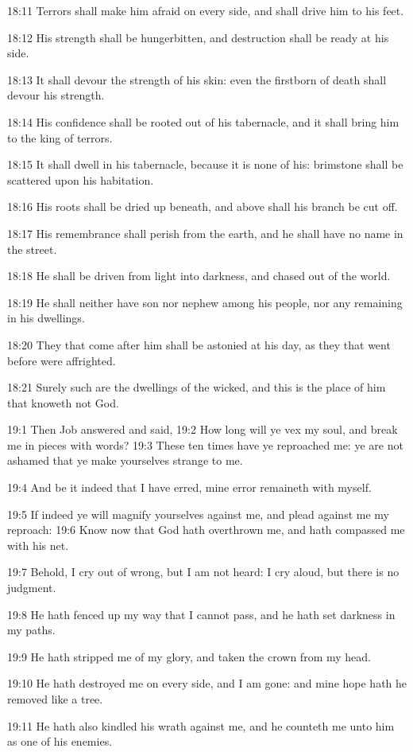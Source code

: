 18:11 Terrors shall make him afraid on every side, and shall drive him
to his feet.

18:12 His strength shall be hungerbitten, and destruction shall be
ready at his side.

18:13 It shall devour the strength of his skin: even the firstborn of
death shall devour his strength.

18:14 His confidence shall be rooted out of his tabernacle, and it
shall bring him to the king of terrors.

18:15 It shall dwell in his tabernacle, because it is none of his:
brimstone shall be scattered upon his habitation.

18:16 His roots shall be dried up beneath, and above shall his branch
be cut off.

18:17 His remembrance shall perish from the earth, and he shall have
no name in the street.

18:18 He shall be driven from light into darkness, and chased out of
the world.

18:19 He shall neither have son nor nephew among his people, nor any
remaining in his dwellings.

18:20 They that come after him shall be astonied at his day, as they
that went before were affrighted.

18:21 Surely such are the dwellings of the wicked, and this is the
place of him that knoweth not God.

19:1 Then Job answered and said, 19:2 How long will ye vex my soul,
and break me in pieces with words?  19:3 These ten times have ye
reproached me: ye are not ashamed that ye make yourselves strange to
me.

19:4 And be it indeed that I have erred, mine error remaineth with
myself.

19:5 If indeed ye will magnify yourselves against me, and plead
against me my reproach: 19:6 Know now that God hath overthrown me, and
hath compassed me with his net.

19:7 Behold, I cry out of wrong, but I am not heard: I cry aloud, but
there is no judgment.

19:8 He hath fenced up my way that I cannot pass, and he hath set
darkness in my paths.

19:9 He hath stripped me of my glory, and taken the crown from my
head.

19:10 He hath destroyed me on every side, and I am gone: and mine hope
hath he removed like a tree.

19:11 He hath also kindled his wrath against me, and he counteth me
unto him as one of his enemies.

